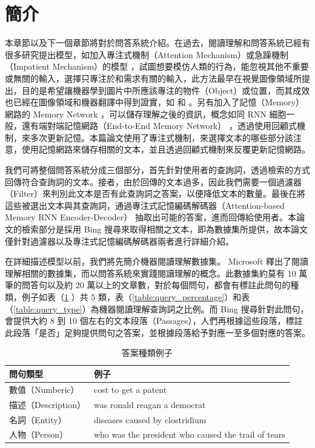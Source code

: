 \section{簡介}
本章節以及下一個章節將對於問答系統介紹。在過去，閱讀理解和問答系統已經有很多研究提出模型，如加入專注式機制（Attention Mechanism）或急躁機制（Impatient Mechanism）的模型 \cite{hermann2015teaching} ，試圖想要模仿人類的行為，能忽視其他不重要或無關的輸入，選擇只專注於和需求有關的輸入，此方法最早在視覺圖像領域所提出，目的是希望讓機器學到圖片中所應該專注的物件（Object）或位置，而其成效也已經在圖像領域和機器翻譯中得到證實，如 \cite{mnih2014recurrent} 和 \cite{bahdanau2014neural}。另有加入了記憶（Memory）網路的 Memory Network \cite{weston2014memory} ，可以儲存理解之後的資訊，概念如同 RNN 細胞一般，還有端對端記憶網路（End-to-End Memory Network）\cite{sukhbaatar2015end} ，透過使用回顧式機制，來多次更新記憶。本篇論文使用了專注式機制，來選擇文本的哪些部分該注意，使用記憶網路來儲存相關的文本，並且透過回顧式機制來反覆更新記憶網路。

我們可將整個問答系統分成三個部分，首先針對使用者的查詢詞，透過檢索的方式回傳符合查詢詞的文本。接者，由於回傳的文本過多，因此我們需要一個過濾器（Filter）來判別此文本是否有此查詢詞之答案，以便降低文本的數量。最後在將這些被選出文本與其查詢詞，通過專注式記憶編碼解碼器（Attention-based Memory RNN Encoder-Decoder）\cite{xiong2016dynamic} 抽取出可能的答案，進而回傳給使用者。本論文的檢索部分是採用 Bing 搜尋來取得相關之文本，即為數據集所提供，故本論文僅針對過濾器以及專注式記憶編碼解碼器兩者進行詳細介紹。

在詳細描述模型以前，我們將先簡介機器閱讀理解數據集。 Microsoft 釋出了閱讀理解相關的數據集，而以問答系統來實踐閱讀理解的概念。此數據集約莫有 10 萬筆的問答句以及約 20 萬以上的文章數，對於每個問句，都會有標註此問句的種類，例子如表（\ref{table:query_example} ）共 5 類，表（\ref{table:query_percentage}）和表（\ref{table:query_type}）為機器閱讀理解查詢詞之比例。而 Bing 搜尋針對此問句，會提供大約 8 到 10 個左右的文本段落（Passages），人們再根據這些段落，標註此段落「是否」足夠提供問句之答案，並根據段落給予對應一至多個對應的答案。%

\begin{table}
    \caption{答案種類例子}
    \label{table:query_example}
    \centering
    \begin{tabular}[h]{|l|l|}
        \hline
        問句類型 & 例子\\
        \hline
        數值（Numberic） & cost to get a patent\\
        \hline
        描述（Description）& was ronald reagan a democrat\\
        \hline
        名詞（Entity） & diseases caused by clostridium\\
        \hline
        人物（Person） & who was the president who caused the trail of tears\\
        \hline
    \end{tabular}
\end{table}

